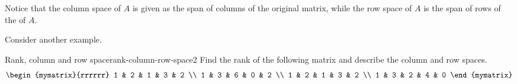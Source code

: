 Notice that the column space of $A$ is given as the span of columns of the original matrix, while the row space of $A$ is the span of rows of the {\rref} of $A$. 

Consider another example.

\begin{example}{Rank, column and row space}{rank-column-row-space2}
Find the rank of the following matrix and describe the
column and row spaces.
\begin{equation*}
\begin{mymatrix}{rrrrrr}
1 & 2 & 1 & 3 & 2 \\
1 & 3 & 6 & 0 & 2 \\
1 & 2 & 1 & 3 & 2 \\
1 & 3 & 2 & 4 & 0
\end{mymatrix}
\end{equation*}
\end{example}

